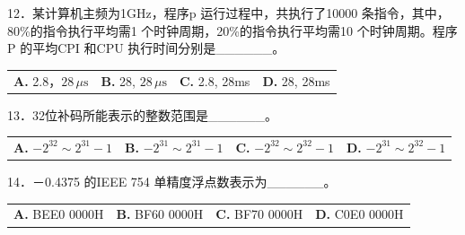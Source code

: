 \documentclass[UTF8,11pt]{ctexart}
\begin{document}
12．某计算机主频为1GHz，程序p 运行过程中，共执行了10000 条指令，其中，80\%的指令执行平均需1 个时钟周期，20\%的指令执行平均需10 个时钟周期。程序P 的平均CPI 和CPU 执行时间分别是\_\_\_\_\_\_。


\begin{center}\begin{tabular}{>{\raggedright\arraybackslash}p{\dimexpr(\linewidth-8\tabcolsep)/4\relax}>{\raggedright\arraybackslash}p{\dimexpr(\linewidth-8\tabcolsep)/4\relax}>{\raggedright\arraybackslash}p{\dimexpr(\linewidth-8\tabcolsep)/4\relax}>{\raggedright\arraybackslash}p{\dimexpr(\linewidth-8\tabcolsep)/4\relax}}
\textbf{A.} 2.\allowbreak{}8，\(\displaystyle 28\,\mu\mathrm{s}\) & \textbf{B.} 28, \(\displaystyle 28\,\mu\mathrm{s}\) & \textbf{C.} 2.\allowbreak{}8, 28ms & \textbf{D.} 28, 28ms\\[.35em]\end{tabular}\end{center}

13．32位补码所能表示的整数范围是\_\_\_\_\_\_。


\begin{center}\begin{tabular}{>{\raggedright\arraybackslash}p{\dimexpr(\linewidth-8\tabcolsep)/4\relax}>{\raggedright\arraybackslash}p{\dimexpr(\linewidth-8\tabcolsep)/4\relax}>{\raggedright\arraybackslash}p{\dimexpr(\linewidth-8\tabcolsep)/4\relax}>{\raggedright\arraybackslash}p{\dimexpr(\linewidth-8\tabcolsep)/4\relax}}
\textbf{A.} \(\displaystyle -2^{32}\sim2^{31}-1\) & \textbf{B.} \(\displaystyle -2^{31}\sim2^{31}-1\) & \textbf{C.} \(\displaystyle -2^{32}\sim2^{32}-1\) & \textbf{D.} \(\displaystyle -2^{31}\sim2^{32}-1\)\\[.35em]\end{tabular}\end{center}

14．－0.4375 的IEEE 754 单精度浮点数表示为\_\_\_\_\_\_。


\begin{center}\begin{tabular}{>{\raggedright\arraybackslash}p{\dimexpr(\linewidth-8\tabcolsep)/4\relax}>{\raggedright\arraybackslash}p{\dimexpr(\linewidth-8\tabcolsep)/4\relax}>{\raggedright\arraybackslash}p{\dimexpr(\linewidth-8\tabcolsep)/4\relax}>{\raggedright\arraybackslash}p{\dimexpr(\linewidth-8\tabcolsep)/4\relax}}
\textbf{A.} BEE0 0000H & \textbf{B.} BF60 0000H & \textbf{C.} BF70 0000H & \textbf{D.} C0E0 0000H\\[.35em]\end{tabular}\end{center}
\end{document}
